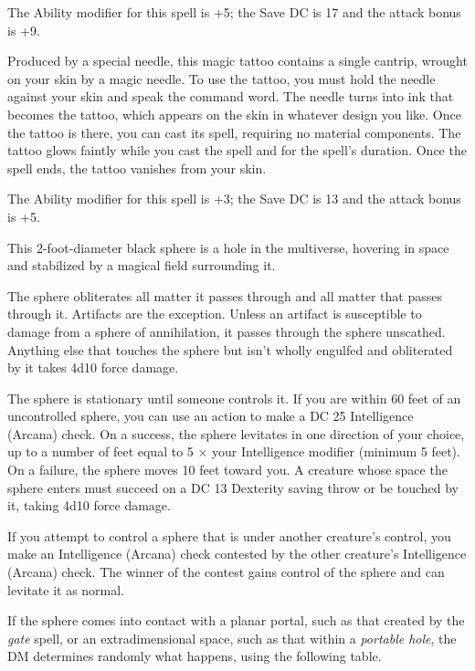 \documentclass[10pt,a4paper,twoside,bg=print,twocolumn,openany,nodeprecatedcode]{dndbook}
\begin{document}
The Ability modifier for this spell is +5; the Save DC is 17 and the attack bonus is +9.

Produced by a special needle, this magic tattoo contains a single cantrip, wrought on your skin by a magic needle. To use the tattoo, you must hold the needle against your skin and speak the command word. The needle turns into ink that becomes the tattoo, which appears on the skin in whatever design you like. Once the tattoo is there, you can cast its spell, requiring no material components. The tattoo glows faintly while you cast the spell and for the spell's duration. Once the spell ends, the tattoo vanishes from your skin.

The Ability modifier for this spell is +3; the Save DC is 13 and the attack bonus is +5.

This 2-foot-diameter black sphere is a hole in the multiverse, hovering in space and stabilized by a magical field surrounding it.

The sphere obliterates all matter it passes through and all matter that passes through it. Artifacts are the exception. Unless an artifact is susceptible to damage from a sphere of annihilation, it passes through the sphere unscathed. Anything else that touches the sphere but isn't wholly engulfed and obliterated by it takes 4d10 force damage.

The sphere is stationary until someone controls it. If you are within 60 feet of an uncontrolled sphere, you can use an action to make a DC 25 Intelligence (Arcana) check. On a success, the sphere levitates in one direction of your choice, up to a number of feet equal to 5 × your Intelligence modifier (minimum 5 feet). On a failure, the sphere moves 10 feet toward you. A creature whose space the sphere enters must succeed on a DC 13 Dexterity saving throw or be touched by it, taking 4d10 force damage.

If you attempt to control a sphere that is under another creature's control, you make an Intelligence (Arcana) check contested by the other creature's Intelligence (Arcana) check. The winner of the contest gains control of the sphere and can levitate it as normal.

If the sphere comes into contact with a planar portal, such as that created by the \textit{gate} spell, or an extradimensional space, such as that within a \textit{portable hole}, the DM determines randomly what happens, using the following table.
\end{document}
